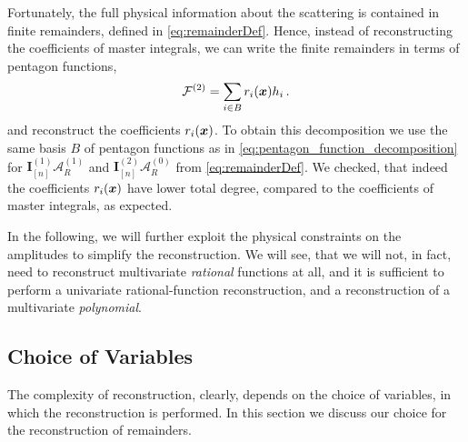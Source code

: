 Fortunately, the full physical information about the scattering is contained in finite remainders, defined in \cref{eq:remainderDef}.
Hence, instead of reconstructing the coefficients of master integrals, we can write the finite remainders in terms of pentagon functions,
\begin{equation}
  \mathcal{F}^{(2)} = \sum_{i \in B} r_i(\vb*{x}) h_i\,.
  \label{eq:remainderPentagon}
\end{equation}
and reconstruct the coefficients $r_i(\vb*{x})$. 
To obtain this decomposition we use the same basis $B$ of pentagon functions as in \cref{eq:pentagon_function_decomposition} 
for $\mathbf{I}_{[n]}^{(1)}\mathcal{A}_R^{(1)}$ and $\mathbf{I}_{[n]}^{(2)}\mathcal{A}_R^{(0)}$ from \cref{eq:remainderDef}.
We checked, that indeed the coefficients $r_i(\vb*{x})$ have lower total degree, compared to the coefficients of master integrals, as expected.

In the following, we will further exploit the physical constraints on the amplitudes to simplify
the reconstruction. We will see, that we will not, in fact, need to reconstruct multivariate \emph{rational} functions at all,
and it is sufficient to perform a univariate rational-function reconstruction, and a reconstruction of a
multivariate \emph{polynomial}.

\subsection{Choice of Variables}

The complexity of reconstruction, clearly, depends on the choice of variables, in which 
the reconstruction is performed. In this section we discuss our choice for the reconstruction of remainders.

